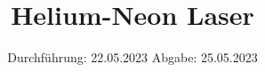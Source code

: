 

\subject{VERSUCH 61}
\title{Helium-Neon Laser}
\date{%
  Durchführung: 22.05.2023
  \hspace{3em}
  Abgabe: 25.05.2023
}



\maketitle
\thispagestyle{empty}
\tableofcontents
\newpage






\printbibliography{}


